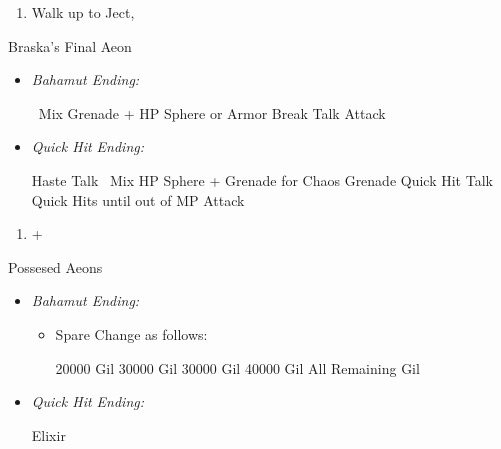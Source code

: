 \begin{multicols}{2}
\begin{enumerate}[resume]
  \item Walk up to Ject, \cs[4:30]
\end{enumerate}
\begin{battle}[180000]{Braska's Final Aeon}
  \begin{itemize}
    \item \textit{Bahamut Ending:}
          \begin{itemize}
            \switch{\yuna}{\rikku}
            \rikkuf \od\ Mix Grenade + HP Sphere or Armor Break
            \tidusf Talk
            \switch{\auron}{\yuna}
            \summon{\bahamut}
            \bahamutf Attack
          \end{itemize}
    \item \textit{Quick Hit Ending:}
          \begin{itemize}
            \yunaf Haste \yuna
            \tidusf Talk
            \switch{\auron}{\rikku}
            \rikkuf \od\ Mix HP Sphere + Grenade for Chaos Grenade
            \yunaf Quick Hit
            \tidusf Talk
            \yunaf Quick Hits until out of MP
            \summon{\bahamut}
            \bahamutf Attack
          \end{itemize}
  \end{itemize}
\end{battle}
\begin{enumerate}[resume]
  \item \cs+\skippablefmv[4:00]
\end{enumerate}
\begin{battle}{Possesed Aeons}
  \begin{itemize}
    \item \textit{Bahamut Ending:}
          \begin{itemize}
            \item Spare Change as follows:
                  \begin{itemize}
                    \valeforf \num{20000} Gil
                    \ifritf \num{30000} Gil
                    \ixilonf \num{30000} Gil
                    \bahamutf \num{40000} Gil
                    \shivaf All Remaining Gil
                  \end{itemize}
          \end{itemize}
    \item \textit{Quick Hit Ending:}
          \begin{itemize}
            \yunaf Elixir \yuna

\end{itemize}
\end{itemize}
\end{battle}
\end{multicols}
